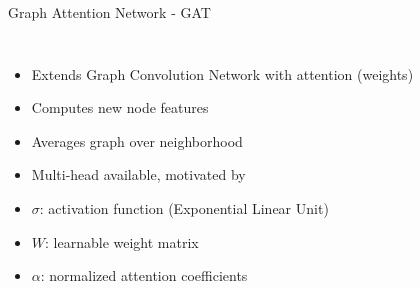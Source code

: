     

      


\begin{frame}{Graph Attention Network - GAT}
  \pause
  \begin{columns}
    \begin{itemize}
      \item Extends Graph Convolution Network with attention (weights)
      \item Computes new node features
      \item Averages graph over neighborhood
      \item Multi-head available, motivated by \cite{transformer}
      \item<3> \alert<3>{$\sigma$: activation function (Exponential Linear Unit)}
      \item<3> \alert<3>{$W$: learnable weight matrix}
      \item<3> \alert<3>{$\alpha$: normalized attention coefficients}
    \end{itemize}
    
  \end{columns}

\end{frame}


